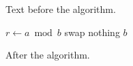 \documentclass{article}
\begin{document}
Text before the algorithm.

\begin{algorithm}[h]
\caption{Euclid's algorithm}\label{euclid}
\begin{algorithmic}[1]
\State $r\gets a\bmod b$
\State swap
\Else
\State nothing
\EndIf
\State \Return $b$
\end{algorithmic}
\end{algorithm}

After the algorithm.
\end{document}
